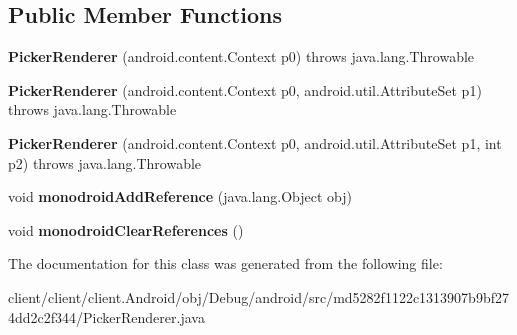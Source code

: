 \subsection*{Public Member Functions}
\begin{DoxyCompactItemize}
\item 
\hypertarget{classmd5282f1122c1313907b9bf274dd2c2f344_1_1PickerRenderer_a5e4d480600fc8990ba23a1cacfb6ad67}{}{\bfseries Picker\+Renderer} (android.\+content.\+Context p0)  throws java.\+lang.\+Throwable 	\label{classmd5282f1122c1313907b9bf274dd2c2f344_1_1PickerRenderer_a5e4d480600fc8990ba23a1cacfb6ad67}

\item 
\hypertarget{classmd5282f1122c1313907b9bf274dd2c2f344_1_1PickerRenderer_a5d60fff6b4ae90556d19701e8c5374fa}{}{\bfseries Picker\+Renderer} (android.\+content.\+Context p0, android.\+util.\+Attribute\+Set p1)  throws java.\+lang.\+Throwable 	\label{classmd5282f1122c1313907b9bf274dd2c2f344_1_1PickerRenderer_a5d60fff6b4ae90556d19701e8c5374fa}

\item 
\hypertarget{classmd5282f1122c1313907b9bf274dd2c2f344_1_1PickerRenderer_a4b83f83a6ee9a98c487cbf342b19ea4c}{}{\bfseries Picker\+Renderer} (android.\+content.\+Context p0, android.\+util.\+Attribute\+Set p1, int p2)  throws java.\+lang.\+Throwable 	\label{classmd5282f1122c1313907b9bf274dd2c2f344_1_1PickerRenderer_a4b83f83a6ee9a98c487cbf342b19ea4c}

\item 
\hypertarget{classmd5282f1122c1313907b9bf274dd2c2f344_1_1PickerRenderer_a0cd94c0f709485d7d2b746d45132f182}{}void {\bfseries monodroid\+Add\+Reference} (java.\+lang.\+Object obj)\label{classmd5282f1122c1313907b9bf274dd2c2f344_1_1PickerRenderer_a0cd94c0f709485d7d2b746d45132f182}

\item 
\hypertarget{classmd5282f1122c1313907b9bf274dd2c2f344_1_1PickerRenderer_aab3f7c19aa6d8d5d4b3222ca03506ccb}{}void {\bfseries monodroid\+Clear\+References} ()\label{classmd5282f1122c1313907b9bf274dd2c2f344_1_1PickerRenderer_aab3f7c19aa6d8d5d4b3222ca03506ccb}

\end{DoxyCompactItemize}


The documentation for this class was generated from the following file\+:\begin{DoxyCompactItemize}
\item 
client/client/client.\+Android/obj/\+Debug/android/src/md5282f1122c1313907b9bf274dd2c2f344/Picker\+Renderer.\+java\end{DoxyCompactItemize}
